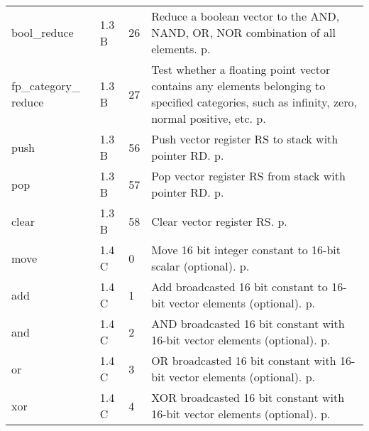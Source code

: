 \documentclass[forwardcom.tex]{subfiles}
\begin{document}
\begin{longtable} {|p{25mm}|p{14mm}|p{10mm}|p{95mm}|}
bool\_reduce  & 1.3 B & 26 & Reduce a boolean vector to the AND, NAND, OR, NOR combination of all elements. p. \pageref{table:boolReduceInstruction} \\

fp\_category\_ reduce & 1.3 B & 27 & Test whether a floating point vector contains any elements belonging to specified categories, such as infinity, zero, normal positive, etc. p. \pageref{table:fpCategoryReduceInstruction} \\

push          & 1.3 B & 56  & Push vector register RS to stack with pointer RD. p. \pageref{table:pushInstruction} \\
pop           & 1.3 B & 57  & Pop vector register RS from stack with pointer RD. p. \pageref{table:popInstruction} \\
clear         & 1.3 B & 58  & Clear vector register RS. p. \pageref{table:clearInstruction} \\

move          & 1.4 C &  0 & Move 16 bit integer constant to 16-bit scalar (optional). p. \pageref{table:moveInstruction} \\
add           & 1.4 C &  1 & Add broadcasted 16 bit constant to 16-bit vector elements (optional). p. \pageref{table:addInstruction} \\
and           & 1.4 C &  2 & AND broadcasted 16 bit constant with 16-bit vector elements (optional). p. \pageref{table:andInstruction} \\
or            & 1.4 C &  3 & OR broadcasted 16 bit constant with 16-bit vector elements (optional). p. \pageref{table:orInstruction} \\
xor           & 1.4 C &  4 & XOR broadcasted 16 bit constant with 16-bit vector elements (optional). p. \pageref{table:xorInstruction} \\


\end{longtable}
\end{document}
